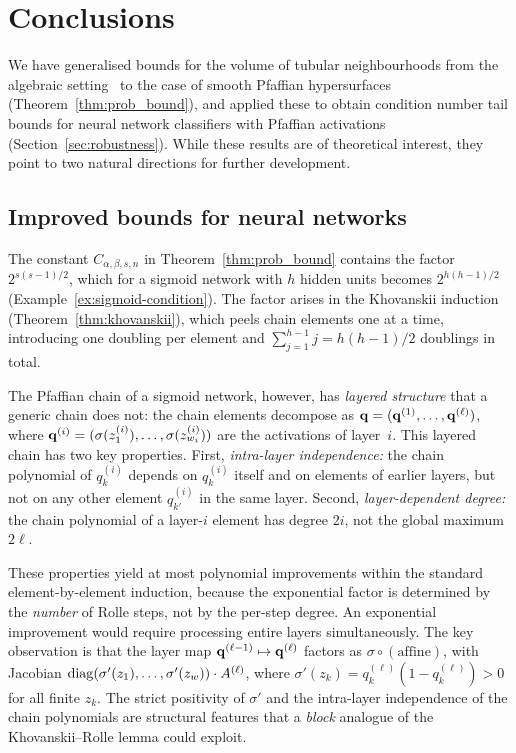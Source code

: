 \section{Conclusions}\label{sec:conclusions}
We have generalised bounds for the volume of tubular neighbourhoods from the algebraic setting~\cite{lotz2015volume} to the case of smooth Pfaffian hypersurfaces (Theorem~\ref{thm:prob_bound}), and applied these to obtain condition number tail bounds for neural network classifiers with Pfaffian activations (Section~\ref{sec:robustness}). While these results are of theoretical interest, they point to two natural directions for further development.

\subsection{Improved bounds for neural networks}\label{subsec:improved-nn}
The constant $C_{\alpha,\beta,s,n}$ in Theorem~\ref{thm:prob_bound} contains the factor $2^{s(s-1)/2}$, which for a sigmoid network with $h$ hidden units becomes $2^{h(h-1)/2}$ (Example~\ref{ex:sigmoid-condition}). The factor arises in the Khovanskii induction (Theorem~\ref{thm:khovanskii}), which peels chain elements one at a time, introducing one doubling per element and $\sum_{j=1}^{h-1}j = h(h-1)/2$ doublings in total.

The Pfaffian chain of a sigmoid network, however, has \emph{layered structure} that a generic chain does not: the chain elements decompose as $\mathbf{q} = (\mathbf{q}^{(1)}, \ldots, \mathbf{q}^{(\ell)})$, where $\mathbf{q}^{(i)} = (\sigma(z_1^{(i)}), \ldots, \sigma(z_{w_i}^{(i)}))$ are the activations of layer~$i$. This layered chain has two key properties. First, \emph{intra-layer independence:} the chain polynomial of $q_k^{(i)}$ depends on $q_k^{(i)}$ itself and on elements of earlier layers, but not on any other element $q_{k'}^{(i)}$ in the same layer. Second, \emph{layer-dependent degree:} the chain polynomial of a layer-$i$ element has degree $2i$, not the global maximum $2\ell$.

These properties yield at most polynomial improvements within the standard element-by-element induction, because the exponential factor is determined by the \emph{number} of Rolle steps, not by the per-step degree. An exponential improvement would require processing entire layers simultaneously. The key observation is that the layer map $\mathbf{q}^{(\ell-1)} \mapsto \mathbf{q}^{(\ell)}$ factors as $\sigma \circ (\text{affine})$, with Jacobian $\operatorname{diag}(\sigma'(z_1), \ldots, \sigma'(z_w)) \cdot A^{(\ell)}$, where $\sigma'(z_k) = q_k^{(\ell)}(1 - q_k^{(\ell)}) > 0$ for all finite $z_k$. The strict positivity of $\sigma'$ and the intra-layer independence of the chain polynomials are structural features that a \emph{block} analogue of the Khovanskii--Rolle lemma could exploit.

